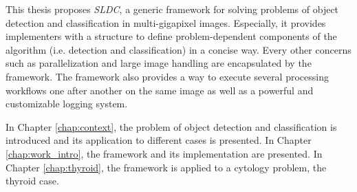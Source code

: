This thesis proposes \textit{SLDC}, a generic framework for solving problems of object detection and classification in multi-gigapixel images. Especially, it provides implementers with a structure to define problem-dependent components of the algorithm (i.e. detection and classification) in a concise way. Every other concerns such as parallelization and large image handling are encapsulated by the framework. The framework also provides a way to execute several processing workflows one after another on the same image as well as a powerful and customizable logging system. 

In Chapter \ref{chap:context}, the problem of object detection and classification is introduced and its application to different cases is presented. In Chapter \ref{chap:work_intro}, the framework and its implementation are presented. In Chapter \ref{chap:thyroid}, the framework is applied to a cytology problem, the thyroid case.